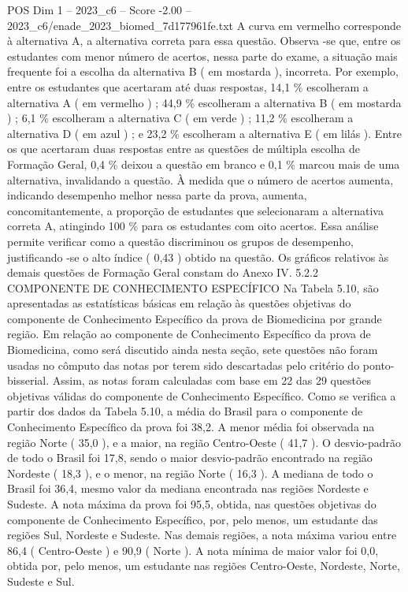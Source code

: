 \begin{textsample}{POS Dim 1 – 2023\_c6 – Score -2.00 – 2023\_c6/enade\_2023\_biomed\_7d177961fe.txt}
A curva em vermelho corresponde à alternativa A, a alternativa correta para essa questão.
Observa -se que, entre os estudantes com menor número de acertos, nessa parte do exame, a situação mais frequente foi a escolha da alternativa B ( em mostarda ), incorreta.
Por exemplo, entre os estudantes que acertaram até duas respostas, 14,1 \% escolheram a alternativa A ( em vermelho ) ; 44,9 \% escolheram a alternativa B ( em mostarda ) ; 6,1 \% escolheram a alternativa C ( em verde ) ; 11,2 \% escolheram a alternativa D ( em azul ) ; e 23,2 \% escolheram a alternativa E ( em lilás ).
Entre os que acertaram duas respostas entre as questões de múltipla escolha de Formação Geral, 0,4 \% deixou a questão em branco e 0,1 \% marcou mais de uma alternativa, invalidando a questão.
À medida que o número de acertos aumenta, indicando desempenho melhor nessa parte da prova, aumenta, concomitantemente, a proporção de estudantes que selecionaram a alternativa correta A, atingindo 100 \% para os estudantes com oito acertos.
Essa análise permite verificar como a questão discriminou os grupos de desempenho, justificando -se o alto índice ( 0,43 ) obtido na questão.
Os gráficos relativos às demais questões de Formação Geral constam do Anexo IV. 5.2.2 COMPONENTE DE CONHECIMENTO ESPECÍFICO Na Tabela 5.10, são apresentadas as estatísticas básicas em relação às questões objetivas do componente de Conhecimento Específico da prova de Biomedicina por grande região.
Em relação ao componente de Conhecimento Específico da prova de Biomedicina, como será discutido ainda nesta seção, sete questões não foram usadas no cômputo das notas por terem sido descartadas pelo critério do ponto-bisserial.
Assim, as notas foram calculadas com base em 22 das 29 questões objetivas válidas do componente de Conhecimento Específico.
Como se verifica a partir dos dados da Tabela 5.10, a média do Brasil para o componente de Conhecimento Específico da prova foi 38,2.
A menor média foi observada na região Norte ( 35,0 ), e a maior, na região Centro-Oeste ( 41,7 ).
O desvio-padrão de todo o Brasil foi 17,8, sendo o maior desvio-padrão encontrado na região Nordeste ( 18,3 ), e o menor, na região Norte ( 16,3 ).
A mediana de todo o Brasil foi 36,4, mesmo valor da mediana encontrada nas regiões Nordeste e Sudeste.
A nota máxima da prova foi 95,5, obtida, nas questões objetivas do componente de Conhecimento Específico, por, pelo menos, um estudante das regiões Sul, Nordeste e Sudeste.
Nas demais regiões, a nota máxima variou entre 86,4 ( Centro-Oeste ) e 90,9 ( Norte ).
A nota mínima de maior valor foi 0,0, obtida por, pelo menos, um estudante nas regiões Centro-Oeste, Nordeste, Norte, Sudeste e Sul.

\end{textsample}
